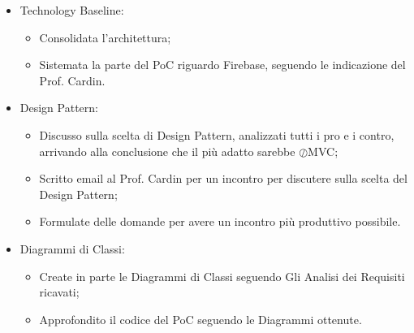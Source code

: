 \documentclass[a4paper, oneside, openany, dvipsnames, table]{article}
\begin{document}
\begin{itemize}
\item Technology Baseline: 
	\begin{itemize}
		\item Consolidata l'architettura;
		\item Sistemata la parte del PoC riguardo Firebase, seguendo le indicazione del Prof. Cardin.
	\end{itemize}
\item Design Pattern:
	\begin{itemize}
	\item  Discusso sulla scelta di Design Pattern, analizzati tutti i pro e i contro, arrivando alla conclusione che il più adatto sarebbe $\oslash$MVC;
	\item Scritto email al Prof. Cardin per un incontro per discutere sulla scelta del Design Pattern;
	\item Formulate delle domande per avere un incontro più produttivo possibile. 	
	\end{itemize}
\item  Diagrammi di Classi:
	\begin{itemize}
		\item Create in parte le Diagrammi di Classi seguendo Gli Analisi dei Requisiti ricavati;
		\item Approfondito il codice del PoC  seguendo le Diagrammi ottenute.
	\end{itemize}
\end{itemize}
\end{document}
